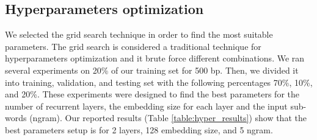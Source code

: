 \documentclass[conference]{IEEEtran}
\begin{document}
\subsection{Hyperparameters optimization}

We selected the grid search technique in order to find the most suitable parameters. The grid search is considered a traditional technique for hyperparameters optimization and it brute force different combinations. We ran several experiments on 20\% of our training set for 500 bp. Then, we divided it into training, validation, and testing set with the following percentages 70\%, 10\%, and 20\%. These experiments were designed to find the best parameters for the number of recurrent layers, the embedding size for each layer and the input sub-words (ngram). Our reported results (Table \ref{table:hyper_results}) show that the best parameters setup is for 2 layers, 128 embedding size, and 5 ngram. 

\end{document}
